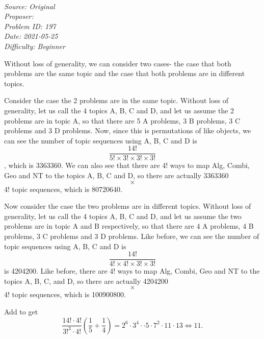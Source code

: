 \SSbreak\\
\emph{Source: Original}\\
\emph{Proposer: \Pcooked}\\ %
\emph{Problem ID: 197}\\
\emph{Date: 2021-05-25}\\
\emph{Difficulty: Beginner}\\
\SSbreak

\bigskip

\begin{solution}\hfil\medskip
	
	Without loss of generality, we can consider two cases- the case that both problems are the same topic and the case that both problems are in different topics.

Consider the case the 2 problems are in the same topic. Without loss of generality, let us call the 4 topics A, B, C and D, and let us assume the 2 problems are in topic A, so that there are 5 A problems, 3 B problems, 3 C problems and 3 D problems. Now, since this is permutations of like objects, we can see the number of topic sequences using A, B, C and D is $$\frac{14!}{5! \times 3! \times 3! \times 3!}$$, which is 3363360. We can also see that there are 4! ways to map Alg, Combi, Geo and NT to the topics A, B, C and D, so there are actually 3363360 $$\times$$ 4! topic sequences, which is 80720640.

Now consider the case the two problems are in different topics. Without loss of generality, let us call the 4 topics A, B, C and D, and let us assume the two problems are in topic A and B respectively, so that there are 4 A problems, 4 B problems, 3 C problems and 3 D problems. Like before, we can see the number of topic sequences using A, B, C and D is $$\frac{14!}{4! \times 4! \times 3! \times 3!}$$ is 4204200. Like before, there are 4! ways to map Alg, Combi, Geo and NT to the topics A, B, C, and D, so there are actually 4204200 $$\times$$ 4! topic sequences, which is 100900800.

Add to get $$\dfrac{14! \cdot 4!}{3!^3 \cdot 4!} \left(\dfrac{1}{5} + \dfrac{1}{4}\right) = 2^6 \cdot 3^4 \cdot \cdot 5 \cdot 7^2 \cdot 11 \cdot 13 \iff \boxed{11}.$$
\end{solution}\bigskip
